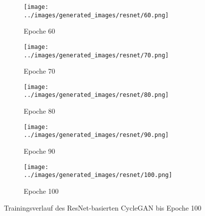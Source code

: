 \begin{figure}[H]
\begin{subfigure}[b]{0.1\textwidth}
\centering
\texttt{[image: ../images/generated\_images/resnet/60.png]}
\caption{Epoche 60}
\end{subfigure}
\hspace{1em}%
\begin{subfigure}[b]{0.1\textwidth}
 \centering
 \texttt{[image: ../images/generated\_images/resnet/70.png]}
 \caption{Epoche 70}
\end{subfigure}
\hspace{1em}%
\begin{subfigure}[b]{0.1\textwidth}
 \centering
 \texttt{[image: ../images/generated\_images/resnet/80.png]}
 \caption{Epoche 80}
\end{subfigure}
\hspace{1em}%
\begin{subfigure}[b]{0.1\textwidth}
 \centering
 \texttt{[image: ../images/generated\_images/resnet/90.png]}
 \caption{Epoche 90}
\end{subfigure}
\hspace{1em}%
\begin{subfigure}[b]{0.1\textwidth}
\centering
\texttt{[image: ../images/generated\_images/resnet/100.png]}
\caption{Epoche 100}
\end{subfigure}
     \caption{Trainingsverlauf des ResNet-basierten \ac{CycleGAN} bis Epoche 100}
     \label{fig:resnet-generated-imgs}
\end{figure}

